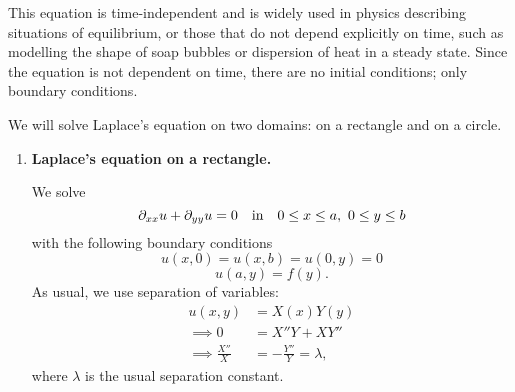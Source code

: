This equation is time-independent and is widely used in physics describing situations of equilibrium, or those that do not depend explicitly on time, such as modelling the shape of soap bubbles or dispersion of heat in a steady state. Since the equation is not dependent on time, there are no initial conditions; only boundary conditions.

We will solve Laplace's equation on two domains: on a rectangle and on a circle.

\begin{enumerate}
	\item \textbf{Laplace's equation on a rectangle.}
	
	We solve
	\[
	\partial_{xx}u + \partial_{yy}u = 0 \quad \text{in} \quad 0 \leq x \leq a, \,\, 0 \leq y \leq b
	\]
	with the following boundary conditions
	\[
	u(x,0) = u(x,b) = u(0,y) = 0
	\]
	\[
	u(a,y) = f(y).
	\]
	As usual, we use separation of variables:
	\begin{align*}
		u(x,y) &= X(x)Y(y) \\
		\implies 0 &= X''Y + XY''\\
		\implies \frac{X''}{X} &= -\frac{Y''}{Y} = \lambda,
	\end{align*}
	where $\lambda$ is the usual separation constant.
	

\end{enumerate}
